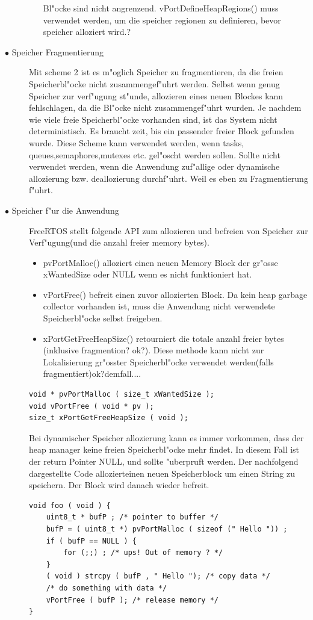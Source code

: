 \documentclass[a4paper, 8pt]{extarticle}
\begin{document}
\begin{multicols*}{3}
\begin{description}
\begin{itemize}
							  Bl"ocke sind nicht angrenzend. vPortDefineHeapRegions() muss verwendet werden, um die speicher regionen zu definieren,
							  bevor speicher alloziert wird.?
					 \end{itemize}
					 \item[$\bullet$ Speicher Fragmentierung]
						 Mit scheme 2 ist es m"oglich Speicher zu fragmentieren, da die freien Speicherbl"ocke nicht zusammengef"uhrt werden. Selbst wenn genug
						 Speicher zur verf"ugung st"unde, allozieren eines neuen Blockes kann fehlschlagen, da die Bl"ocke nicht zusammengef"uhrt wurden. Je nachdem 
						 wie viele freie Speicherbl"ocke vorhanden sind, ist das System nicht deterministisch. Es braucht zeit, bis ein passender freier Block gefunden
						 wurde. Diese Scheme kann verwendet werden, wenn tasks, queues,semaphores,mutexes etc. gel"oscht werden sollen. Sollte nicht verwendet werden, wenn die
						 Anwendung zuf"allige oder dynamische allozierung bzw. deallozierung durchf"uhrt. Weil es eben zu Fragmentierung f"uhrt.
					\item[$\bullet$ Speicher f"ur die Anwendung]
						 FreeRTOS stellt folgende API zum allozieren und befreien von Speicher zur Verf"ugung(und die anzahl freier memory bytes).
						 \begin{itemize}
							\item pvPortMalloc() alloziert einen neuen Memory Block der gr"osse xWantedSize oder NULL wenn es nicht funktioniert hat.
							\item vPortFree() befreit einen zuvor allozierten Block. Da kein heap garbage collector vorhanden ist, muss die Anwendung nicht 
								  verwendete Speicherbl"ocke selbst freigeben.
							\item xPortGetFreeHeapSize() retourniert die totale anzahl freier bytes (inklusive fragmention? ok?). Diese methode kann nicht
								  zur Lokalisierung gr"osster Speicherbl"ocke verwendet werden(falls fragmentiert)ok?demfall....
						 \end{itemize}
						 \begin{lstlisting}
void * pvPortMalloc ( size_t xWantedSize );
void vPortFree ( void * pv );
size_t xPortGetFreeHeapSize ( void );
						\end{lstlisting}
						Bei dynamischer Speicher allozierung kann es immer vorkommen, dass der heap manager keine freien Speicherbl"ocke mehr findet.
						In diesem Fall ist der return Pointer NULL, und sollte "uberpruft werden. Der nachfolgend dargestellte Code allozierteinen neuen Speicherblock
						um einen String zu speichern. Der Block wird danach wieder befreit.
						 \begin{lstlisting}
void foo ( void ) {
	uint8_t * bufP ; /* pointer to buffer */
	bufP = ( uint8_t *) pvPortMalloc ( sizeof (" Hello ")) ;
	if ( bufP == NULL ) {
		for (;;) ; /* ups! Out of memory ? */
	}
	( void ) strcpy ( bufP , " Hello "); /* copy data */
	/* do something with data */
	vPortFree ( bufP ); /* release memory */
}
						\end{lstlisting}
				\end{description}


\end{multicols*}
\end{document}
